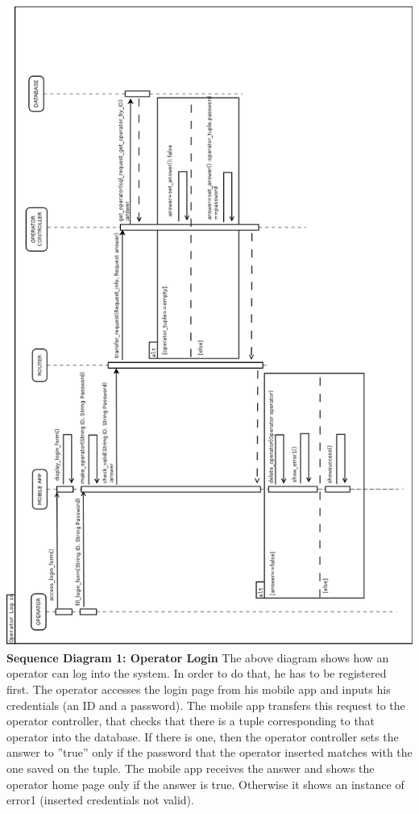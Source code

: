 \documentclass{article}
\begin{document}
\begin{flushleft}
\includegraphics[scale=0.4]{seq1_login} 
\newpage
\textbf{Sequence Diagram 1: Operator Login}
\break
The above diagram shows how an operator can log into the system. In order to do that, he has to be registered first. The operator accesses the login page from his mobile app and inputs his credentials (an ID and a password). The mobile app transfers this request to the operator controller, that checks that there is a tuple corresponding to that operator into the database. If there is one, then the operator controller sets the answer to ''true'' only if the password that the operator inserted matches with the one saved on the tuple. The mobile app receives the answer and shows the operator home page only if the answer is true. Otherwise it shows an instance of error1 (inserted credentials not valid). \\

\end{flushleft}
\end{document}
